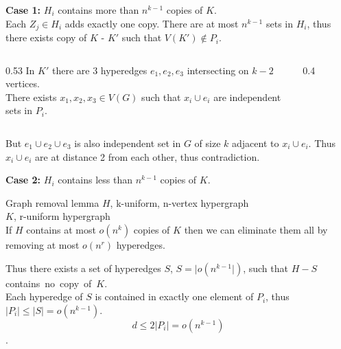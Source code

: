 
\begin{frame}
    \begin{header}\textcolor{cfred}{
    \textbf{Case 1:}} \(H_i\) contains more than \(n^{k-1}\) copies of \(K\).\\
    Each \(Z_j\in H_i\) adds exactly one copy. There are at most \(n^{k-1}\) sets in \(H_i\), thus there exists copy of \(K\) - \(K'\) such that \(V(K')\notin P_i\).\\
    \vspace{1em}
    \begin{columns}
    \begin{column}{0.53\textwidth}
    In \(K'\) there are 3 hyperedges \(e_1,e_2,e_3\) intersecting on \(k-2\) vertices.\\
    \vspace{1em}
    There exists \(x_1,x_2,x_3 \in V(G)\) such that \(x_i \cup e_i\) are independent sets in \(P_i\).\\
    \vspace{1em}
    \end{column}
    \begin{column}{0.4\textwidth}
        \begin{figure}
            \centering
            
        \end{figure}
    \end{column}
    \end{columns}
    \pause
    But \(e_1 \cup e_2 \cup e_3\) is also independent set in \(G\) of size \(k\) adjacent to \(x_i \cup e_i\). Thus \(x_i \cup e_i\) are at distance 2 from each other, thus contradiction.    
\end{header}
\end{frame}


\begin{frame}
     \begin{header}\textcolor{cfred}{\textbf{Case 2:}} \(H_i\) contains less than \(n^{k-1}\) copies of \(K\).
     \begin{lemma}{Graph removal lemma}
        \(H\), k-uniform, n-vertex hypergraph\\
        \(K\), r-uniform hypergraph\\
        If \(H\) contains at most \(o(n^k)\) copies of \(K\) then we can eliminate them all by removing at most \(o(n^r)\) hyperedges.
     \end{lemma}
     \pause
     Thus there exists a set of hyperedges \(S\), \(S=|o(n^{k-1}|)\), such that \(H-S\) contains~no~copy~of~\(K\).\\
     \vspace{1em}
     Each hyperedge of \(S\) is contained in exactly one element of \(P_i\), thus \(|P_i|\leq |S| = o(n^{k-1})\). \\
     \[d\leq 2 | P_i|=o(n^{k-1})\].
\end{header}
\end{frame}

